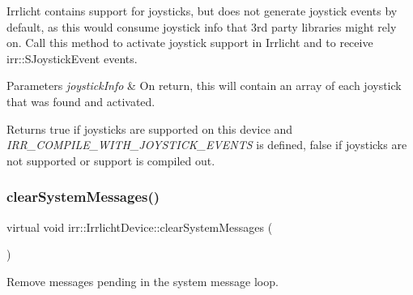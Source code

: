 Irrlicht contains support for joysticks, but does not generate joystick events by default, as this would consume joystick info that 3rd party libraries might rely on. Call this method to activate joystick support in Irrlicht and to receive irr\+::\+S\+Joystick\+Event events. 
\begin{DoxyParams}{Parameters}
{\em joystick\+Info} & On return, this will contain an array of each joystick that was found and activated. \\
\hline
\end{DoxyParams}
\begin{DoxyReturn}{Returns}
true if joysticks are supported on this device and {\itshape I\+R\+R\+\_\+\+C\+O\+M\+P\+I\+L\+E\+\_\+\+W\+I\+T\+H\+\_\+\+J\+O\+Y\+S\+T\+I\+C\+K\+\_\+\+E\+V\+E\+N\+TS} is defined, false if joysticks are not supported or support is compiled out. 
\end{DoxyReturn}
\mbox{\label{classirr_1_1IrrlichtDevice_aa10c6151a267d8a1500d5dc7b44425dd}} 
\subsubsection{\texorpdfstring{clear\+System\+Messages()}{clearSystemMessages()}\hspace{0.1cm}{\footnotesize\ttfamily [1/2]}}
{\footnotesize\ttfamily virtual void irr\+::\+Irrlicht\+Device\+::clear\+System\+Messages (\begin{DoxyParamCaption}{ }\end{DoxyParamCaption})\hspace{0.3cm}{\ttfamily [pure virtual]}}



Remove messages pending in the system message loop. 

